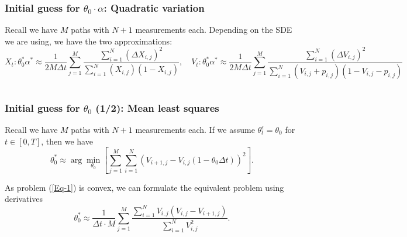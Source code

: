 \documentclass[aspectratio=169]{beamer}\usepackage[utf8]{inputenc}
\begin{document}
\begin{frame}\frametitle{Initial guess for $\theta_0\cdot\alpha$: Quadratic variation}

Recall we have $M$ paths with $N+1$ measurements each. Depending on the SDE we are using, we have the two approximations:
{\footnotesize
\begin{equation*}
X_t:\theta_0^*\alpha^*\approx \frac{1}{2M\Delta t} \sum\limits_{j=1}^M \frac{ \sum\limits_{i=1}^{N} (\Delta X_{i,j})^2}{\sum\limits_{i=1}^{N} (X_{i,j})(1-X_{i,j})},\quad V_t:\theta_0^*\alpha^*\approx \frac{1}{2M\Delta t} \sum\limits_{j=1}^M \frac{ \sum\limits_{i=1}^{N} (\Delta V_{i,j})^2}{\sum\limits_{i=1}^{N} (V_{i,j}+p_{i,j})(1-V_{i,j}-p_{i,j})}
\end{equation*}
}
\begin{center}
\begin{tabular}{|c|}
\toprule
{\tiny

}\\
\bottomrule
\end{tabular}
\end{center}

\end{frame}


\begin{frame}\frametitle{Initial guess for $\theta_0$ (1/2): Mean least squares} \label{VF}
Recall we have $M$ paths with $N+1$ measurements each. If we assume $\theta_t^\epsilon=\theta_0$ for $t\in[0,T]$, then we have
\begin{equation}
\theta_0^*\approx\arg\min_{\theta_0}{\left[\sum_{j=1}^M\sum_{i=1}^N\left(V_{i+1,j}-V_{i,j}(1-\theta_0\Delta t)\right)^2\right]}.
\label{Eq-1}
\end{equation}

%

As problem (\ref{Eq-1}) is convex, we can formulate the equivalent problem using derivatives
\begin{equation*}
\theta_0^*\approx\frac{1}{\Delta t\cdot M}\sum_{j=1}^M\frac{\sum_{i=1}^NV_{i,j}(V_{i,j}-V_{i+1,j})}{\sum_{i=1}^NV_{i,j}^2}.
\end{equation*}

\end{frame}
\end{document}
